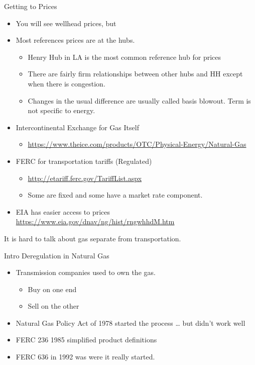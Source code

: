\documentclass[
  ignorenonframetext,
]{beamer}
\providecommand{\tightlist}{%
  \setlength{\itemsep}{0pt}\setlength{\parskip}{0pt}}
\begin{document}
\begin{frame}{Getting to Prices}
\protect\hypertarget{getting-to-prices}{}

\begin{itemize}
\tightlist
\item
  You will see wellhead prices, but
\item
  Most references prices are at the hubs.

  \begin{itemize}
  \tightlist
  \item
    Henry Hub in LA is the most common reference hub for prices
  \item
    There are fairly firm relationships between other hubs and HH except
    when there is congestion.
  \item
    Changes in the usual difference are usually called basis blowout.
    Term is not specific to energy.
  \end{itemize}
\item
  Intercontinental Exchange for Gas Itself

  \begin{itemize}
  \tightlist
  \item
    \url{https://www.theice.com/products/OTC/Physical-Energy/Natural-Gas}
  \end{itemize}
\item
  FERC for transportation tariffs (Regulated)

  \begin{itemize}
  \tightlist
  \item
    \url{http://etariff.ferc.gov/TariffList.aspx}
  \item
    Some are fixed and some have a market rate component.
  \end{itemize}
\item
  EIA has easier access to prices
  \url{https://www.eia.gov/dnav/ng/hist/rngwhhdM.htm}
\end{itemize}

It is hard to talk about gas separate from transportation.

\end{frame}

\begin{frame}{Intro Deregulation in Natural Gas}
\protect\hypertarget{intro-deregulation-in-natural-gas}{}

\begin{itemize}
\tightlist
\item
  Transmission companies used to own the gas.

  \begin{itemize}
  \tightlist
  \item
    Buy on one end
  \item
    Sell on the other
  \end{itemize}
\item
  Natural Gas Policy Act of 1978 started the process \ldots{} but didn't
  work well
\item
  FERC 236 1985 simplified product definitions
\item
  FERC 636 in 1992 was were it really started.
\end{itemize}

\end{frame}
\end{document}
